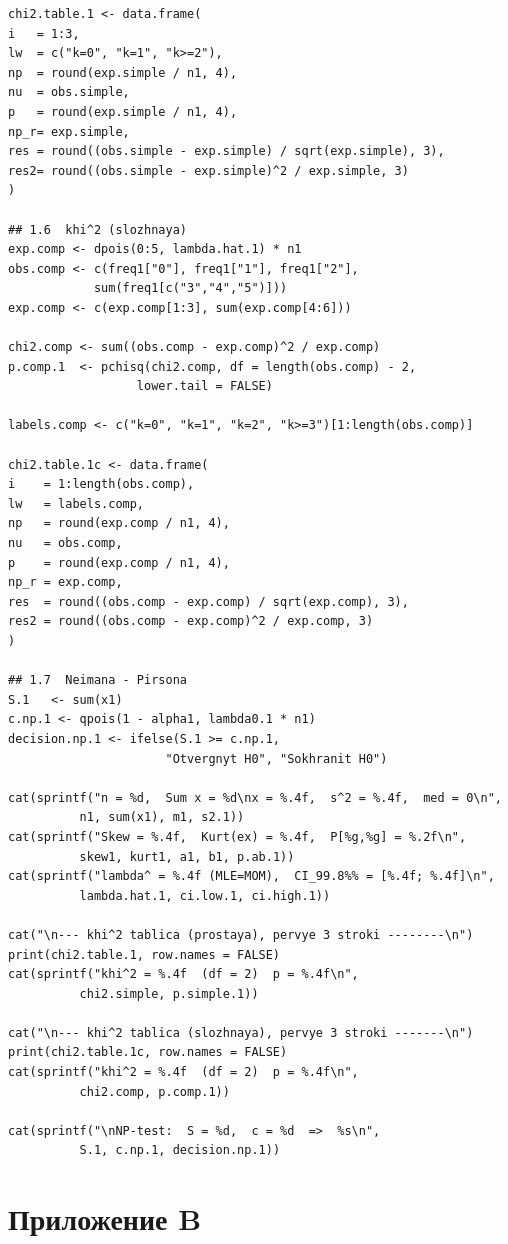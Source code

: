 \documentclass[areasetadvanced]{scrartcl}
\begin{document}
\begin{lstlisting}
chi2.table.1 <- data.frame(
i   = 1:3,
lw  = c("k=0", "k=1", "k>=2"),
np  = round(exp.simple / n1, 4),
nu  = obs.simple,
p   = round(exp.simple / n1, 4),
np_r= exp.simple,
res = round((obs.simple - exp.simple) / sqrt(exp.simple), 3),
res2= round((obs.simple - exp.simple)^2 / exp.simple, 3)
)

## 1.6  khi^2 (slozhnaya) 
exp.comp <- dpois(0:5, lambda.hat.1) * n1
obs.comp <- c(freq1["0"], freq1["1"], freq1["2"],
            sum(freq1[c("3","4","5")]))
exp.comp <- c(exp.comp[1:3], sum(exp.comp[4:6]))

chi2.comp <- sum((obs.comp - exp.comp)^2 / exp.comp)
p.comp.1  <- pchisq(chi2.comp, df = length(obs.comp) - 2,
                  lower.tail = FALSE)

labels.comp <- c("k=0", "k=1", "k=2", "k>=3")[1:length(obs.comp)]

chi2.table.1c <- data.frame(
i    = 1:length(obs.comp),
lw   = labels.comp,
np   = round(exp.comp / n1, 4),
nu   = obs.comp,
p    = round(exp.comp / n1, 4),
np_r = exp.comp,
res  = round((obs.comp - exp.comp) / sqrt(exp.comp), 3),
res2 = round((obs.comp - exp.comp)^2 / exp.comp, 3)
)

## 1.7  Neimana - Pirsona 
S.1   <- sum(x1)
c.np.1 <- qpois(1 - alpha1, lambda0.1 * n1)
decision.np.1 <- ifelse(S.1 >= c.np.1,
                      "Otvergnyt H0", "Sokhranit H0")

cat(sprintf("n = %d,  Sum x = %d\nx = %.4f,  s^2 = %.4f,  med = 0\n",
          n1, sum(x1), m1, s2.1))
cat(sprintf("Skew = %.4f,  Kurt(ex) = %.4f,  P[%g,%g] = %.2f\n",
          skew1, kurt1, a1, b1, p.ab.1))
cat(sprintf("lambda^ = %.4f (MLE=MOM),  CI_99.8%% = [%.4f; %.4f]\n",
          lambda.hat.1, ci.low.1, ci.high.1))

cat("\n--- khi^2 tablica (prostaya), pervye 3 stroki --------\n")
print(chi2.table.1, row.names = FALSE)
cat(sprintf("khi^2 = %.4f  (df = 2)  p = %.4f\n",
          chi2.simple, p.simple.1))

cat("\n--- khi^2 tablica (slozhnaya), pervye 3 stroki -------\n")
print(chi2.table.1c, row.names = FALSE)
cat(sprintf("khi^2 = %.4f  (df = 2)  p = %.4f\n",
          chi2.comp, p.comp.1))

cat(sprintf("\nNP-test:  S = %d,  c = %d  =>  %s\n",
          S.1, c.np.1, decision.np.1))
\end{lstlisting}

\newpage
\section*{Приложение B}
\end{document}
